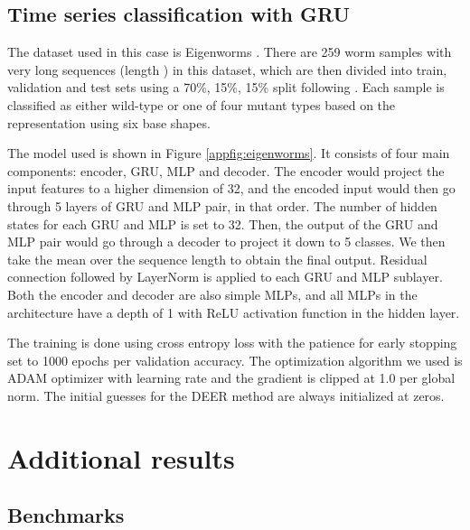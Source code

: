 \subsection{Time series classification with GRU}
\label{appsec:gru-training-details}

The dataset used in this case is Eigenworms \citep{brown2013dictionaryeigenworms}. There are 259 worm samples with very long sequences (length ) in this dataset, which are then divided into train, validation and test sets using a 70\%, 15\%, 15\% split following \cite{morrill2021neuralrough}. Each sample is classified as either wild-type or one of four mutant types based on the representation using six base shapes.

The model used is shown in Figure \ref{appfig:eigenworms}. It consists of four main components: encoder, GRU, MLP and decoder. The encoder would project the input features to a higher dimension of 32, and the encoded input would then go through 5 layers of GRU and MLP pair, in that order. The number of hidden states for each GRU and MLP is set to 32. Then, the output of the GRU and MLP pair would go through a decoder to project it down to 5 classes. We then take the mean over the sequence length to obtain the final output. Residual connection followed by LayerNorm is applied to each GRU and MLP sublayer. Both the encoder and decoder are also simple MLPs, and all MLPs in the architecture have a depth of 1 with ReLU activation function in the hidden layer.

The training is done using cross entropy loss with the patience for early stopping set to 1000 epochs per validation accuracy. The optimization algorithm we used is ADAM optimizer with  learning rate and the gradient is clipped at 1.0 per global norm. The initial guesses for the DEER method are always initialized at zeros.














\section{Additional results}

\subsection{Benchmarks}
\label{appsec:benchmarks}

